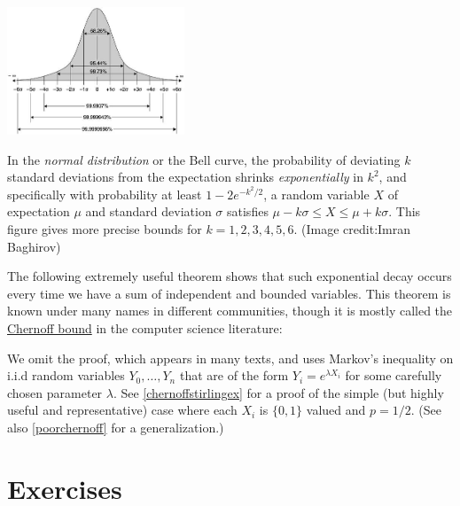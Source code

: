 \begin{marginfigure}
\centering
\includegraphics[width=\linewidth, height=1.5in, keepaspectratio]{../figure/sixsigma.jpg}
\caption{In the \emph{normal distribution} or the Bell curve, the
probability of deviating \(k\) standard deviations from the expectation
shrinks \emph{exponentially} in \(k^2\), and specifically with
probability at least \(1-2e^{-k^2/2}\), a random variable \(X\) of
expectation \(\mu\) and standard deviation \(\sigma\) satisfies
\(\mu -k\sigma \leq X \leq \mu+k\sigma\). This figure gives more precise
bounds for \(k=1,2,3,4,5,6\). (Image credit:Imran Baghirov)}
\label{empiricalbellfig}
\end{marginfigure}

The following extremely useful theorem shows that such exponential decay
occurs every time we have a sum of independent and bounded variables.
This theorem is known under many names in different communities, though
it is mostly called the
\href{https://en.wikipedia.org/wiki/Chernoff_bound}{Chernoff bound} in
the computer science literature:

\hypertarget{chernoffthm}{}

We omit the proof, which appears in many texts, and uses Markov's
inequality on i.i.d random variables \(Y_0,\ldots,Y_n\) that are of the
form \(Y_i = e^{\lambda X_i}\) for some carefully chosen parameter
\(\lambda\). See \cref{chernoffstirlingex} for a proof of the simple
(but highly useful and representative) case where each \(X_i\) is
\(\{0,1\}\) valued and \(p=1/2\). (See also \cref{poorchernoff} for a
generalization.)

\section{Exercises}\label{Exercises}

